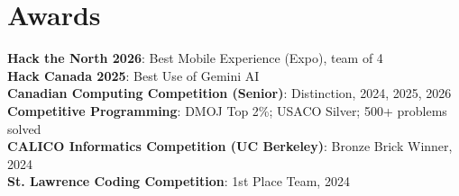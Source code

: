 \documentclass[letterpaper,11pt]{article}
\begin{document}
\section{Awards}
 \begin{itemize}[leftmargin=0.15in, label={}]
    \small{\item{
     \textbf{Hack the North 2026}{: Best Mobile Experience (Expo), team of 4} \\
     \textbf{Hack Canada 2025}{: Best Use of Gemini AI} \\
     \textbf{Canadian Computing Competition (Senior)}{: Distinction, 2024, 2025, 2026} \\
     \textbf{Competitive Programming}{: DMOJ Top 2\%; USACO Silver; 500+ problems solved} \\
     \textbf{CALICO Informatics Competition (UC Berkeley)}{: Bronze Brick Winner, 2024} \\
     \textbf{St. Lawrence Coding Competition}{: 1st Place Team, 2024}
    }}
 \end{itemize}

\end{document}
